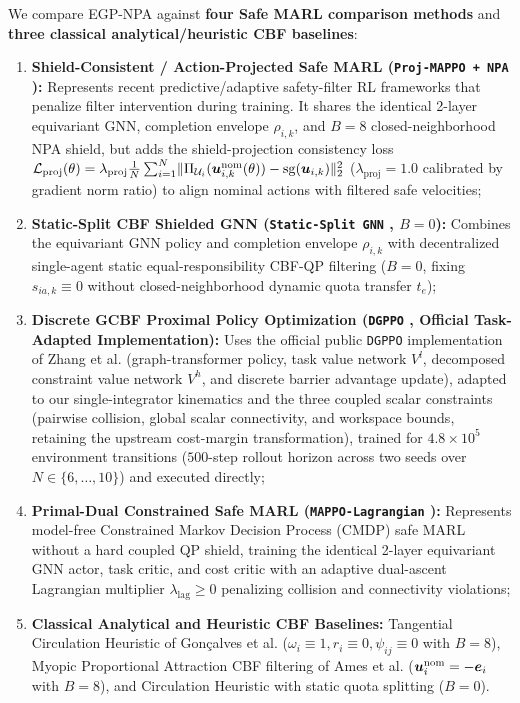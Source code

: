 We compare EGP-NPA against \textbf{four Safe MARL comparison methods} and \textbf{three classical analytical/heuristic CBF baselines}:
\begin{enumerate}
 \item \textbf{Shield-Consistent / Action-Projected Safe MARL (\texttt{Proj-MAPPO + NPA} \cite{wabersich2021,liu2026saferl}):} Represents recent predictive/adaptive safety-filter RL frameworks that penalize filter intervention during training. It shares the identical 2-layer equivariant GNN, completion envelope $\rho_{i,k}$, and $B=8$ closed-neighborhood NPA shield, but adds the shield-projection consistency loss $\mathcal L_{\mathrm{proj}}(\theta)=\lambda_{\mathrm{proj}}\frac1N\sum_{i=1}^N\lVert\Pi_{\mathcal U_i}(\boldsymbol{u}_{i,k}^{\mathrm{nom}}(\theta))-\operatorname{sg}(\boldsymbol{u}_{i,k})\rVert_2^2$ ($\lambda_{\mathrm{proj}}=1.0$ calibrated by gradient norm ratio) to align nominal actions with filtered safe velocities;
 \item \textbf{Static-Split CBF Shielded GNN (\texttt{Static-Split GNN} \cite{ames2017cbf,zhang2025gcbf}, $B=0$):} Combines the equivariant GNN policy and completion envelope $\rho_{i,k}$ with decentralized single-agent static equal-responsibility CBF-QP filtering ($B=0$, fixing $s_{ia,k}\equiv 0$ without closed-neighborhood dynamic quota transfer $t_e$);
 \item \textbf{Discrete GCBF Proximal Policy Optimization (\texttt{DGPPO} \cite{zhang2025dgppo}, Official Task-Adapted Implementation):} Uses the official public \texttt{DGPPO} implementation of Zhang et al. \cite{zhang2025dgppo} (graph-transformer policy, task value network $V^l$, decomposed constraint value network $V^h$, and discrete barrier advantage update), adapted to our single-integrator kinematics and the three coupled scalar constraints (pairwise collision, global scalar connectivity, and workspace bounds, retaining the upstream cost-margin transformation), trained for $4.8\times 10^5$ environment transitions ($500$-step rollout horizon across two seeds over $N\in\{6,\dots,10\}$) and executed directly;
 \item \textbf{Primal-Dual Constrained Safe MARL (\texttt{MAPPO-Lagrangian} \cite{gu2023safe}):} Represents model-free Constrained Markov Decision Process (CMDP) safe MARL without a hard coupled QP shield, training the identical 2-layer equivariant GNN actor, task critic, and cost critic with an adaptive dual-ascent Lagrangian multiplier $\lambda_{\mathrm{lag}}\ge 0$ penalizing collision and connectivity violations;
 \item \textbf{Classical Analytical and Heuristic CBF Baselines:} Tangential Circulation Heuristic of Gon\c{c}alves et al. \cite{goncalves2023circulation} ($\omega_i\equiv 1,r_i\equiv 0,\psi_{ij}\equiv 0$ with $B=8$), Myopic Proportional Attraction CBF filtering of Ames et al. \cite{ames2017cbf,reis2021} ($\boldsymbol{u}_i^{\mathrm{nom}}=-\boldsymbol{e}_i$ with $B=8$), and Circulation Heuristic with static quota splitting ($B=0$).
\end{enumerate}
